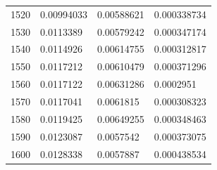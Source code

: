 \begin{center}
\begin{longtable}{l|l|l|l}
1520                                                   & 0.00994033                                                        & 0.00588621                                               & 0.000338734                                                        \\
1530                                                   & 0.0113389                                                         & 0.00579242                                               & 0.000347174                                                        \\
1540                                                   & 0.0114926                                                         & 0.00614755                                               & 0.000312817                                                        \\
1550                                                   & 0.0117212                                                         & 0.00610479                                               & 0.000371296                                                        \\
1560                                                   & 0.0117122                                                         & 0.00631286                                               & 0.0002951                                                          \\
1570                                                   & 0.0117041                                                         & 0.0061815                                                & 0.000308323                                                        \\
1580                                                   & 0.0119425                                                         & 0.00649255                                               & 0.000348463                                                        \\
1590                                                   & 0.0123087                                                         & 0.0057542                                                & 0.000373075                                                        \\
1600                                                   & 0.0128338                                                         & 0.0057887                                                & 0.000438534                                                        \\

\end{longtable}
\end{center}
